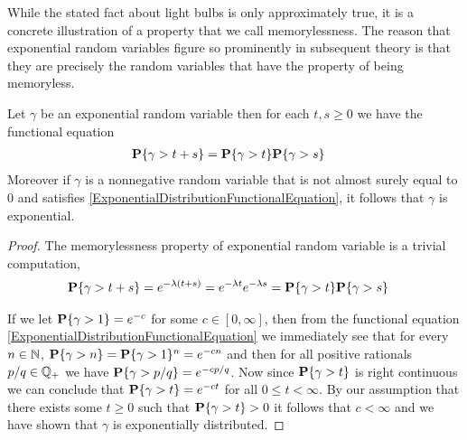While the stated fact about light bulbs is only
approximately true, it is a concrete illustration of a property
that we call memorylessness.
The reason that exponential random variables figure so prominently in
subsequent theory is that they are precisely the random variables that
have the property of being memoryless.
\begin{prop}\label{ExponentialMemoryless}Let $\gamma$ be an
  exponential random variable then for each $t,s \geq 0$ we have the
  functional equation
\begin{align}
\textbf{P}\{\gamma > t+s\} &= \textbf{P}\{\gamma > t\}\textbf{P}\{\gamma > s\}
\label{ExponentialDistributionFunctionalEquation}\end{align}
Moreover if $\gamma$ is a nonnegative random variable that is not almost surely
equal to $0$ and satisfies \eqref{ExponentialDistributionFunctionalEquation}, it
follows that $\gamma$ is exponential.
\end{prop}
\begin{proof}
The memorylessness property of exponential random variable is a
trivial computation, 
\begin{align*}
\textbf{P}\{\gamma > t+s\} &= e^{-\lambda(t+s)} = e^{-\lambda
  t}e^{-\lambda s} = \textbf{P}\{\gamma >
  t\}\textbf{P}\{\gamma > s\}
\end{align*}

If we let $\textbf{P}\{\gamma > 1\}= e^{-c}$ for some $c \in [0,
\infty]$, then from the functional equation
\eqref{ExponentialDistributionFunctionalEquation}
we immediately see that for every $n \in
\mathbb{N}$, $\textbf{P}\{\gamma > n\}=\textbf{P}\{\gamma >
  1\}^n= e^{-cn}$ and then for all
positive rationals $p/q \in \mathbb{Q}_+$ we have
$\textbf{P}\{\gamma > p/q\} = e^{-cp/q}$.  Now since
$\textbf{P}\{\gamma > t\}$ is right continuous we can conclude that
$\textbf{P}\{\gamma > t\}= e^{-ct}$ for all $0 \leq t < \infty$.
By our assumption that there exists some $t \geq 0$ such that
$\textbf{P}\{\gamma > t\} > 0$
it follows that $c < \infty$ and we have shown that $\gamma$ is
exponentially distributed.
\end{proof}

